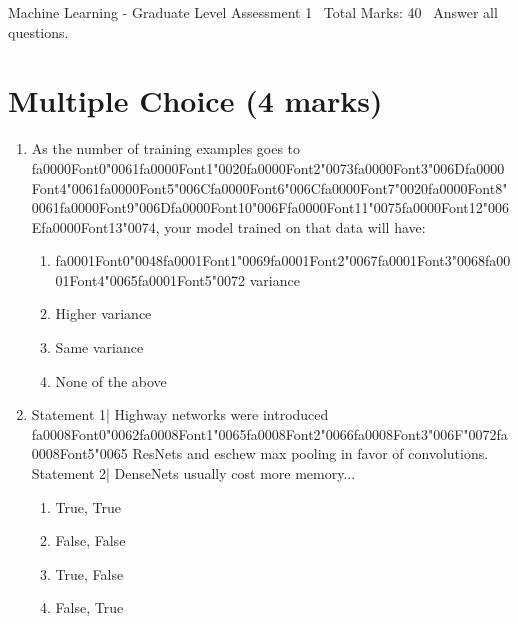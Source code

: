 \documentclass[12pt]{article}
\begin{document}
\begin{center}
Machine Learning - Graduate Level Assessment 1 \
Total Marks: 40 \
Answer all questions.
\end{center}

\section*{Multiple Choice (4 marks)}
\begin{enumerate}[label=\arabic*.]
\item As the number of training examples goes to {\csname fa0000Font0\endcsname\char"0061}{\csname fa0000Font1\endcsname\char"0020}{\csname fa0000Font2\endcsname\char"0073}{\csname fa0000Font3\endcsname\char"006D}{\csname fa0000Font4\endcsname\char"0061}{\csname fa0000Font5\endcsname\char"006C}{\csname fa0000Font6\endcsname\char"006C}{\csname fa0000Font7\endcsname\char"0020}{\csname fa0000Font8\endcsname\char"0061}{\csname fa0000Font9\endcsname\char"006D}{\csname fa0000Font10\endcsname\char"006F}{\csname fa0000Font11\endcsname\char"0075}{\csname fa0000Font12\endcsname\char"006E}{\csname fa0000Font13\endcsname\char"0074}, your model trained on that data will have:
\begin{enumerate}[label=(\alph*)]
    \item {\csname fa0001Font0\endcsname\char"0048}{\csname fa0001Font1\endcsname\char"0069}{\csname fa0001Font2\endcsname\char"0067}{\csname fa0001Font3\endcsname\char"0068}{\csname fa0001Font4\endcsname\char"0065}{\csname fa0001Font5\endcsname\char"0072} variance
    \item Higher variance
    \item Same variance
    \item None of the above
\end{enumerate}
\item Statement 1| Highway networks were introduced {\csname fa0008Font0\endcsname\char"0062}{\csname fa0008Font1\endcsname\char"0065}{\csname fa0008Font2\endcsname\char"0066}{\csname fa0008Font3\endcsname\char"006F}{\char"0072}{\csname fa0008Font5\endcsname\char"0065} ResNets and eschew max pooling in favor of convolutions. Statement 2| DenseNets usually cost more memory...
\begin{enumerate}[label=(\alph*)]
    \item True, True
    \item False, False
    \item True, False
    \item False, True
\end{enumerate}
\end{enumerate}
\end{document}
